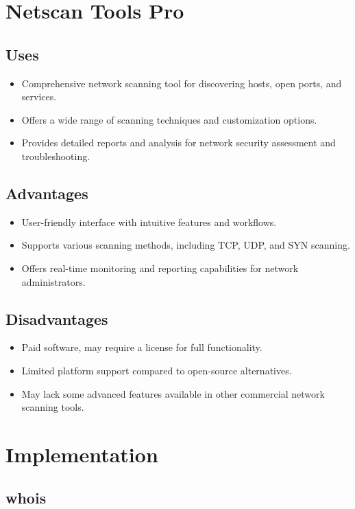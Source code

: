 \documentclass[11pt]{article}
\begin{document}
\section{Netscan Tools Pro}

\subsection{Uses}
\begin{itemize}
    \item Comprehensive network scanning tool for discovering hosts, open ports, and services.
    \item Offers a wide range of scanning techniques and customization options.
    \item Provides detailed reports and analysis for network security assessment and troubleshooting.
\end{itemize}

\subsection{Advantages}
\begin{itemize}
    \item User-friendly interface with intuitive features and workflows.
    \item Supports various scanning methods, including TCP, UDP, and SYN scanning.
    \item Offers real-time monitoring and reporting capabilities for network administrators.
\end{itemize}

\subsection{Disadvantages}
\begin{itemize}
    \item Paid software, may require a license for full functionality.
    \item Limited platform support compared to open-source alternatives.
    \item May lack some advanced features available in other commercial network scanning tools.
\end{itemize}


\section{Implementation}

\subsection{whois}
\end{document}
